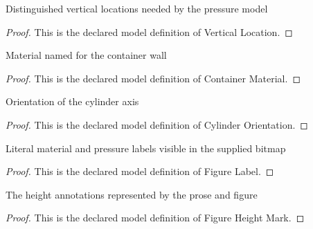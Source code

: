 \begin{definition}
  \label{def:physics:phyx-mini-0385:phyxminiproblems-problemphyxmini0385-verticallocation}
  Distinguished vertical locations needed by the pressure model
\end{definition}
\begin{proof}
  This is the declared model definition of Vertical Location.
\end{proof}
\begin{definition}
  \label{def:physics:phyx-mini-0385:phyxminiproblems-problemphyxmini0385-containermaterial}
  Material named for the container wall
\end{definition}
\begin{proof}
  This is the declared model definition of Container Material.
\end{proof}
\begin{definition}
  \label{def:physics:phyx-mini-0385:phyxminiproblems-problemphyxmini0385-cylinderorientation}
  Orientation of the cylinder axis
\end{definition}
\begin{proof}
  This is the declared model definition of Cylinder Orientation.
\end{proof}
\begin{definition}
  \label{def:physics:phyx-mini-0385:phyxminiproblems-problemphyxmini0385-figurelabel}
  Literal material and pressure labels visible in the supplied bitmap
\end{definition}
\begin{proof}
  This is the declared model definition of Figure Label.
\end{proof}
\begin{definition}
  \label{def:physics:phyx-mini-0385:phyxminiproblems-problemphyxmini0385-figureheightmark}
  The height annotations represented by the prose and figure
\end{definition}
\begin{proof}
  This is the declared model definition of Figure Height Mark.
\end{proof}
